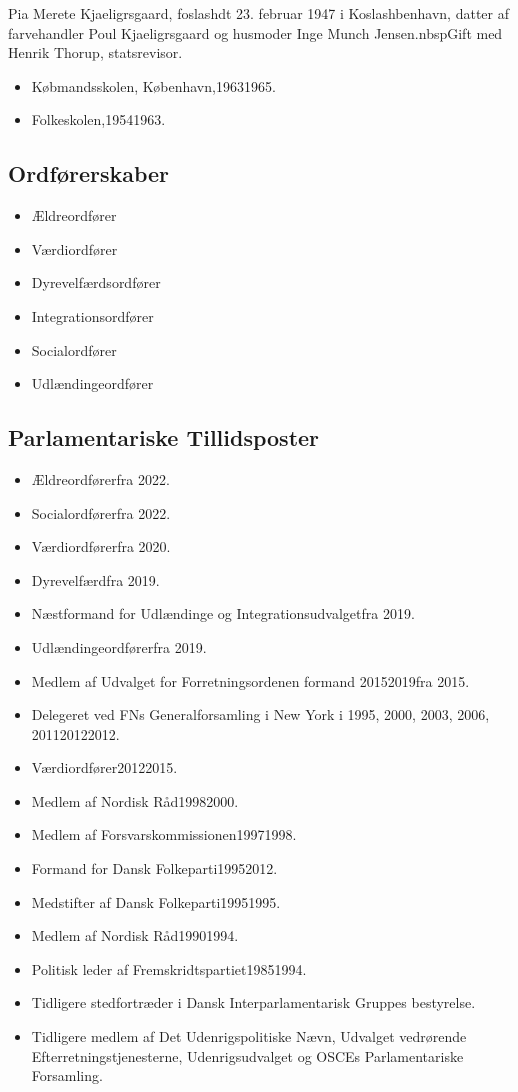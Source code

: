 \documentclass[11pt, a4paper]{awesome-cv}
\begin{document}
\makecvheader[R]
\makelettertitle
\begin{cvletter}
Pia Merete Kjaeligrsgaard, foslashdt 23. februar 1947 i Koslashbenhavn, datter af farvehandler Poul Kjaeligrsgaard og husmoder Inge Munch Jensen.nbspGift med Henrik Thorup, statsrevisor.

\begin{itemize}
\item Købmandsskolen, København,19631965.
\item Folkeskolen,19541963.
\end{itemize}
\subsection*{Ordførerskaber}
\begin{itemize}
\item Ældreordfører
\item Værdiordfører
\item Dyrevelfærdsordfører
\item Integrationsordfører
\item Socialordfører
\item Udlændingeordfører
\end{itemize}
\subsection*{Parlamentariske Tillidsposter}
\begin{itemize}
\item Ældreordførerfra 2022.
\item Socialordførerfra 2022.
\item Værdiordførerfra 2020.
\item Dyrevelfærdfra 2019.
\item Næstformand for Udlændinge og Integrationsudvalgetfra 2019.
\item Udlændingeordførerfra 2019.
\item Medlem af Udvalget for Forretningsordenen formand 20152019fra 2015.
\item Delegeret ved FNs Generalforsamling i New York i 1995, 2000, 2003, 2006, 201120122012.
\item Værdiordfører20122015.
\item Medlem af Nordisk Råd19982000.
\item Medlem af Forsvarskommissionen19971998.
\item Formand for Dansk Folkeparti19952012.
\item Medstifter af Dansk Folkeparti19951995.
\item Medlem af Nordisk Råd19901994.
\item Politisk leder af Fremskridtspartiet19851994.
\item Tidligere stedfortræder i Dansk Interparlamentarisk Gruppes bestyrelse.
\item Tidligere medlem af Det Udenrigspolitiske Nævn, Udvalget vedrørende Efterretningstjenesterne, Udenrigsudvalget og OSCEs Parlamentariske Forsamling.
\end{itemize}

\end{cvletter}
\end{document}
